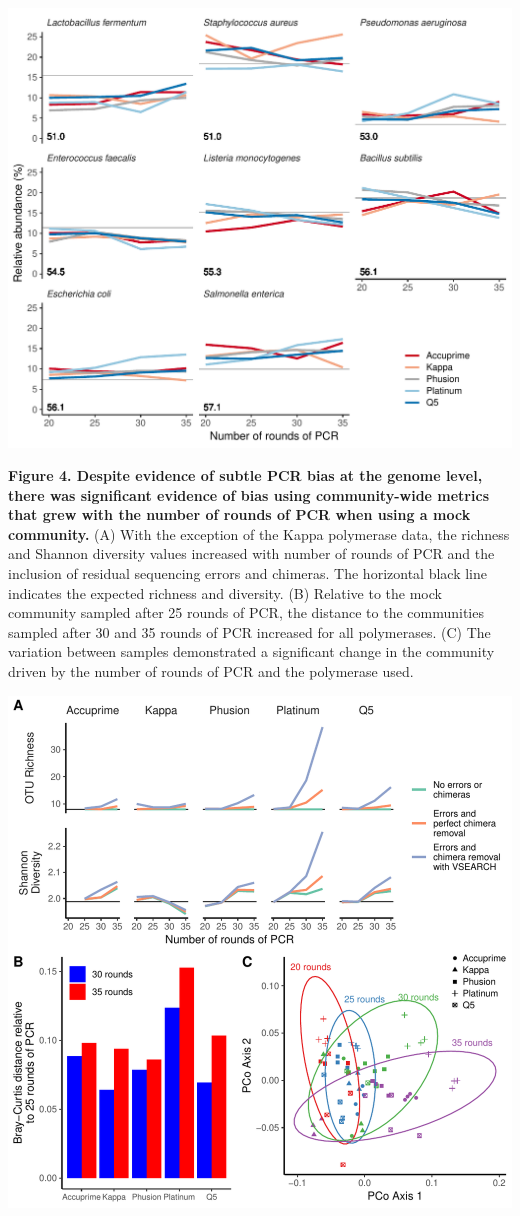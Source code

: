 \documentclass[11pt,]{article}
\begin{document}
\includegraphics[width=1.0\columnwidth]{../results/figures/species_bias.pdf}

\newpage

\textbf{Figure 4. Despite evidence of subtle PCR bias at the genome
level, there was significant evidence of bias using community-wide
metrics that grew with the number of rounds of PCR when using a mock
community.} (A) With the exception of the Kappa polymerase data, the
richness and Shannon diversity values increased with number of rounds of
PCR and the inclusion of residual sequencing errors and chimeras. The
horizontal black line indicates the expected richness and diversity. (B)
Relative to the mock community sampled after 25 rounds of PCR, the
distance to the communities sampled after 30 and 35 rounds of PCR
increased for all polymerases. (C) The variation between samples
demonstrated a significant change in the community driven by the number
of rounds of PCR and the polymerase used.

\includegraphics[width=0.9\columnwidth]{../results/figures/mock_community.pdf}
\end{document}
